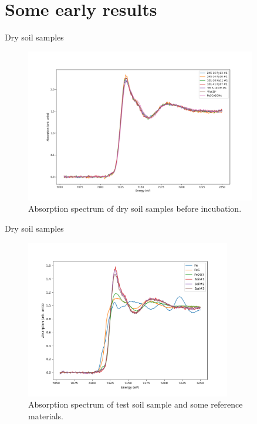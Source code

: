 \documentclass{beamer}
\begin{document}
  \section{Some early results}
  \begin{frame}{Dry soil samples}
  \begin{figure}
    \centering
    \includegraphics[width=0.9\textwidth]{../Kuvat/Dry_Soil_Samples1.png}
    \caption{Absorption spectrum of dry soil samples before incubation.}
  \end{figure}  
  \end{frame}
  
  \begin{frame}{Dry soil samples}
  \begin{figure}
    \centering
    \includegraphics[width=0.8\textwidth]{../Kuvat/ferefplus123.png}
    \caption{Absorption spectrum of test soil sample and some reference materials.}
  \end{figure}  
  \end{frame}
  
\end{document}
